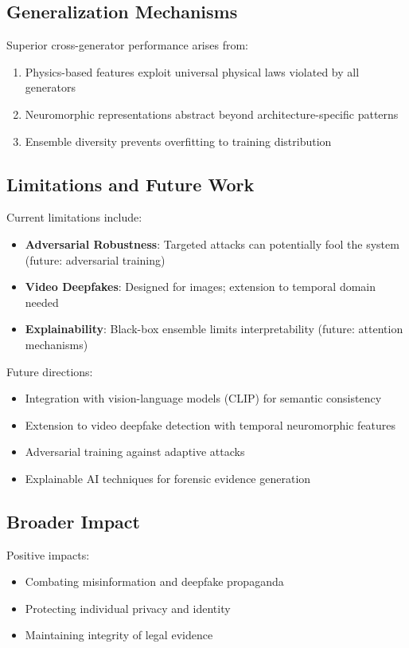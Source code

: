 \documentclass[runningheads]{llncs}
\begin{document}
\subsection{Generalization Mechanisms}

Superior cross-generator performance arises from:
\begin{enumerate}
    \item Physics-based features exploit universal physical laws violated by all generators
    \item Neuromorphic representations abstract beyond architecture-specific patterns
    \item Ensemble diversity prevents overfitting to training distribution
\end{enumerate}

\subsection{Limitations and Future Work}

Current limitations include:
\begin{itemize}
    \item \textbf{Adversarial Robustness}: Targeted attacks can potentially fool the system (future: adversarial training)
    \item \textbf{Video Deepfakes}: Designed for images; extension to temporal domain needed
    \item \textbf{Explainability}: Black-box ensemble limits interpretability (future: attention mechanisms)
\end{itemize}

Future directions:
\begin{itemize}
    \item Integration with vision-language models (CLIP) for semantic consistency
    \item Extension to video deepfake detection with temporal neuromorphic features
    \item Adversarial training against adaptive attacks
    \item Explainable AI techniques for forensic evidence generation
\end{itemize}

\subsection{Broader Impact}

Positive impacts:
\begin{itemize}
    \item Combating misinformation and deepfake propaganda
    \item Protecting individual privacy and identity
    \item Maintaining integrity of legal evidence
\end{itemize}
\end{document}
